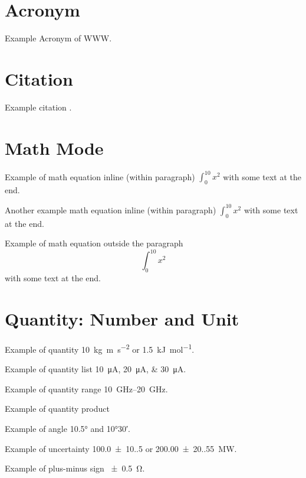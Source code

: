 \section{Acronym}
Example Acronym of \ac{WWW}.

\section{Citation}

Example citation \cite{shannon1949communication}.

\section{Math Mode}


Example of math equation inline (within paragraph) $ \int_{0}^{10} x^2 $ with some text at the end.

Another example math equation inline (within paragraph) \( \int_{0}^{10} x^2 \) with some text at the end.

Example of math equation outside the paragraph \[ \int_{0}^{10} x^2 \] with some text at the end.

\section{Quantity: Number and Unit}

Example of quantity \qty{10}{\kg\m\per\s\squared} or \qty[per-mode=symbol]{1.5}{\kJ\per\mol}.

Example of quantity list \qtylist{10;20;30}{\uA}.

Example of quantity range \qtyrange{10}{20}{\GHz}.

Example of quantity product 

Example of angle \ang{10.5} and \ang{10;30}.

Example of uncertainty \qty{100.0(10.5)}{\nF} or \qty[separate-uncertainty-units = repeat]{200.00(20.55)}{\MW}.

Example of plus-minus sign \qty{\pm 0.5}{\ohm}.


